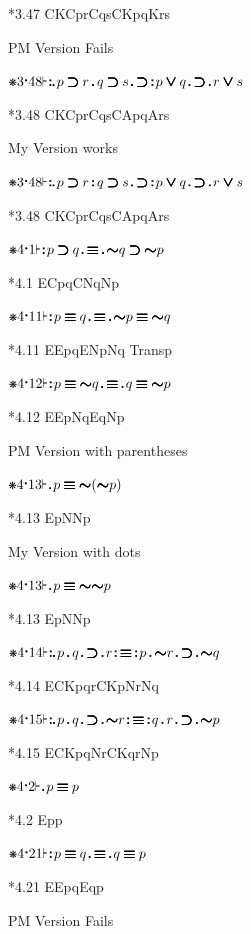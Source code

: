 \documentclass[12pt]{article}
\newcommand{\pmthm}{\mathpunct{\text{\scalebox{.5}[1]{$\boldsymbol\vdash$}}}} %
\newcommand{\pmast}{\text{\resizebox{!}{.75\height}{\ding{107}}}} %
\newcommand{\pmcdot}{\text{\raisebox{.05cm}{$\boldsymbol\cdot$}}} %
\newcommand{\pmd}{\hbox{\rule{.3ex}{.3ex}}} %
\newcommand{\pmdd}{\overset{\pmd}{\pmd}} %
\newcommand{\pmdot}{\mathinner{\pmd}}
\newcommand{\pmdott}{\mathinner{\pmdd}}
\newcommand{\pmdottt}{\mathinner{\pmdd\hspace{1pt}\pmd}}
\newcommand{\pmnot}{\mathord{\ooalign{$\boldsymbol{\sim}\mkern.5mu$\hidewidth\cr$\boldsymbol{\sim}$\cr\hidewidth$\mkern.5mu\boldsymbol{\sim}$}}}
\newcommand{\pmor}{\mathbin{\ooalign{$\boldsymbol{\vee}\mkern.5mu$\hidewidth\cr$\boldsymbol{\vee}$\cr\hidewidth$\mkern.5mu\boldsymbol{\vee}$}}}
\newcommand{\pmimp}{\mathbin{\ooalign{$\boldsymbol{\supset}\mkern.5mu$\hidewidth\cr$\boldsymbol{\supset}$\cr\hidewidth$\mkern.5mu\boldsymbol{\supset}$}}} %
\newcommand{\pmand}{\mathbin{\pmd}}%
\newcommand{\pmandd}{\mathbin{\pmdd}}
\newcommand{\pmiff}{\mathbin{\ooalign{$\boldsymbol{\equiv}\mkern.5mu$\hidewidth\cr$\boldsymbol{\equiv}$\cr\hidewidth$\mkern.5mu\boldsymbol{\equiv}$}}} %
\begin{document}
*3.47 CKCprCqsCKpqKrs

PM Version Fails

$\pmast 3 \pmcdot 48 \pmthm \pmdottt p \pmimp r \pmand q \pmimp s \pmdot \pmimp \pmdott p \pmor q \pmdot \pmimp \pmdot r \pmor s $

*3.48 CKCprCqsCApqArs

My Version works

$\pmast 3 \pmcdot 48 \pmthm \pmdottt p \pmimp r \pmandd q \pmimp s \pmdot \pmimp \pmdott p \pmor q \pmdot \pmimp \pmdot r \pmor s $

*3.48 CKCprCqsCApqArs

$\pmast 4 \pmcdot 1 \pmthm \pmdott p \pmimp q \pmdot \pmiff \pmdot \pmnot q \pmimp \pmnot p    $

*4.1 ECpqCNqNp

$\pmast 4 \pmcdot 11 \pmthm \pmdott p \pmiff q \pmdot \pmiff \pmdot \pmnot p \pmiff \pmnot q    $

*4.11 EEpqENpNq Transp

$\pmast 4 \pmcdot 12 \pmthm \pmdott p \pmiff \pmnot q \pmdot \pmiff \pmdot q \pmiff \pmnot p    $

*4.12 EEpNqEqNp

PM Version with parentheses 

$\pmast 4 \pmcdot 13 \pmthm \pmdot p \pmiff \pmnot ( \pmnot p ) $

*4.13 EpNNp

My Version with dots 

$\pmast 4 \pmcdot 13 \pmthm \pmdot p \pmiff \pmnot \pmnot p $

*4.13 EpNNp

$\pmast 4 \pmcdot 14 \pmthm \pmdottt p \pmand q \pmdot \pmimp \pmdot r \pmdott \pmiff \pmdott p \pmand \pmnot r \pmdot \pmimp \pmdot \pmnot q    $

*4.14 ECKpqrCKpNrNq

$\pmast 4 \pmcdot 15 \pmthm \pmdottt p \pmand q \pmdot \pmimp \pmdot \pmnot r \pmdott \pmiff \pmdott q \pmand r \pmdot \pmimp \pmdot \pmnot p    $

*4.15 ECKpqNrCKqrNp




$\pmast 4 \pmcdot 2 \pmthm \pmdot p \pmiff p $

*4.2 Epp

$\pmast 4 \pmcdot 21 \pmthm \pmdott p \pmiff q \pmdot \pmiff \pmdot q \pmiff p $

*4.21 EEpqEqp

PM Version Fails
\end{document}
